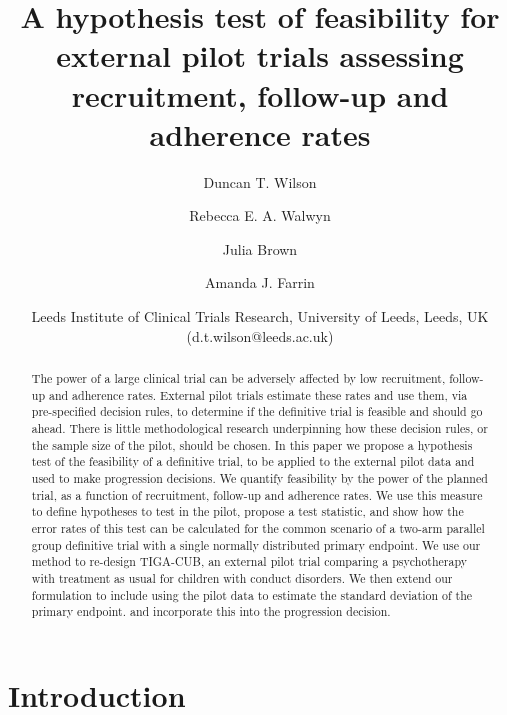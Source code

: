 \documentclass{article}
\begin{document}
\title{A hypothesis test of feasibility for external pilot trials assessing recruitment, follow-up and adherence rates}

\author{Duncan T. Wilson \and
	Rebecca E. A. Walwyn \and
	Julia Brown \and
	Amanda J. Farrin }
\date{Leeds Institute of Clinical Trials Research, University of Leeds, Leeds, UK (d.t.wilson@leeds.ac.uk)}

\maketitle

\begin{abstract}
The power of a large clinical trial can be adversely affected by low recruitment, follow-up and adherence rates. External pilot trials estimate these rates and use them, via pre-specified decision rules, to determine if the definitive trial is feasible and should go ahead. There is little methodological research underpinning how these decision rules, or the sample size of the pilot, should be chosen. In this paper we propose a hypothesis test of the feasibility of a definitive trial, to be applied to the external pilot data and used to make progression decisions. We quantify feasibility by the power of the planned trial, as a function of recruitment, follow-up and adherence rates. We use this measure to define hypotheses to test in the pilot, propose a test statistic, and show how the error rates of this test can be calculated for the common scenario of a two-arm parallel group definitive trial with a single normally distributed primary endpoint. We use our method to re-design TIGA-CUB, an external pilot trial comparing a psychotherapy with treatment as usual for children with conduct disorders. We then extend our formulation to include using the pilot data to estimate the standard deviation of the primary endpoint. and incorporate this into the progression decision.
\end{abstract}

\section{Introduction}\label{sec:intro}
\end{document}
